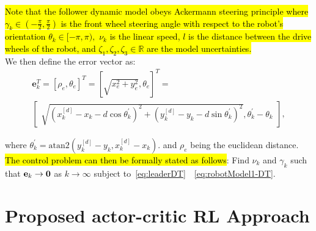 \documentclass[conference]{IEEEtran}
\begin{document}
\hl{Note that the follower dynamic model obeys Ackermann steering principle where $\gamma_k\in(-\frac{\pi}{2},\frac{\pi}{2})$ is the front wheel steering angle with respect to the robot's orientation $\theta_k\in[-\pi,\pi),$ $\nu_k$ is the linear speed, $l$ is the distance between the drive wheels of the robot, and $\zeta_1,\zeta_2,\zeta_3\in\mathbb{R}$ are the model uncertainties.} 
\\
We then define the error vector as:
 \begin{multline}
     \label{eq:stateError}
   \mathbf {e}_k^T = [\rho_e,\theta_e]^T =
   [\sqrt{x_e^2+y_e^2},\theta_e]^T = \\
   \begin{bmatrix}
     \sqrt{(x_k^{[d]} - x_k - d\cos\theta_k^{'})^2+
     (y_k^{[d]} - y_k - d\sin\theta_k^{'})^2},
     \theta_k^{'} - \theta_k
   \end{bmatrix},
 \end{multline}
 
 where $\theta_k^{'} = \mathrm{atan2}\left(y_k^{[d]}-y_k, x_k^{[d]}-x_k\right).$ and ${\rho_e}$ being the euclidean distance. 
\\
\hl{The control problem can then be formally stated as follows}: Find $\nu_k$ and $\gamma_k$ such that ${\bf e}_k\to {\bf 0}$ as  $k\to\infty$ subject to~\eqref{eq:leaderDT}~~\eqref{eq:robotModel1-DT}.

%
%




\section{Proposed actor-critic RL Approach}

 \label{sec:RLSolution}
\end{document}
